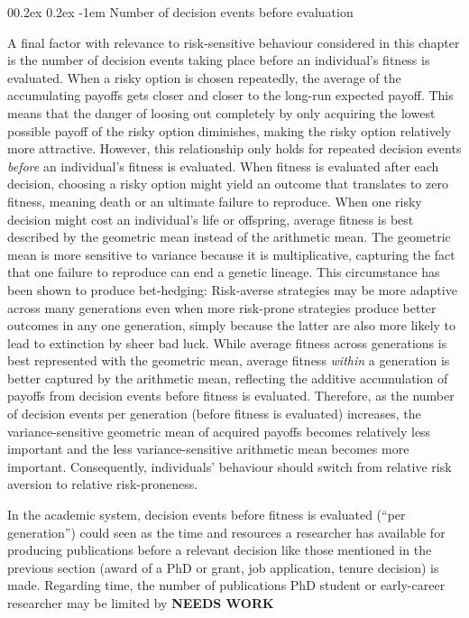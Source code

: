 \documentclass[british,,man,floatsintext]{apa6}
\makeatletter
\renewcommand{\paragraph}{\@startsection{paragraph}{4}{\parindent}%
  {0\baselineskip \@plus 0.2ex \@minus 0.2ex}%
  {-1em}%
  {\normalfont\normalsize\bfseries\itshape\typesectitle}}
\makeatother
\begin{document}
\hypertarget{number-of-decision-events-before-evaluation}{%
\paragraph{Number of decision events before evaluation}\label{number-of-decision-events-before-evaluation}}

A final factor with relevance to risk-sensitive behaviour considered in this chapter is the number of decision events taking place before an individual's fitness is evaluated.
When a risky option is chosen repeatedly, the average of the accumulating payoffs gets closer and closer to the long-run expected payoff.
This means that the danger of loosing out completely by only acquiring the lowest possible payoff of the risky option diminishes, making the risky option relatively more attractive.
However, this relationship only holds for repeated decision events \emph{before} an individual's fitness is evaluated.
When fitness is evaluated after each decision, choosing a risky option might yield an outcome that translates to zero fitness, meaning death or an ultimate failure to reproduce.
When one risky decision might cost an individual's life or offspring, average fitness is best described by the geometric mean instead of the arithmetic mean.
The geometric mean is more sensitive to variance because it is multiplicative, capturing the fact that one failure to reproduce can end a genetic lineage.
This circumstance has been shown to produce bet-hedging:
Risk-averse strategies may be more adaptive across many generations even when more risk-prone strategies produce better outcomes in any one generation, simply because the latter are also more likely to lead to extinction by sheer bad luck.
While average fitness across generations is best represented with the geometric mean, average fitness \emph{within} a generation is better captured by the arithmetic mean, reflecting the additive accumulation of payoffs from decision events before fitness is evaluated.
Therefore, as the number of decision events per generation (before fitness is evaluated) increases, the variance-sensitive geometric mean of acquired payoffs becomes relatively less important and the less variance-sensitive arithmetic mean becomes more important.
Consequently, individuals' behaviour should switch from relative risk aversion to relative risk-proneness.

In the academic system, decision events before fitness is evaluated (\enquote{per generation}) could seen as the time and resources a researcher has available for producing publications before a relevant decision like those mentioned in the previous section (award of a PhD or grant, job application, tenure decision) is made.
Regarding time, the number of publications PhD student or early-career researcher may be limited by
\textbf{NEEDS WORK}
\end{document}
